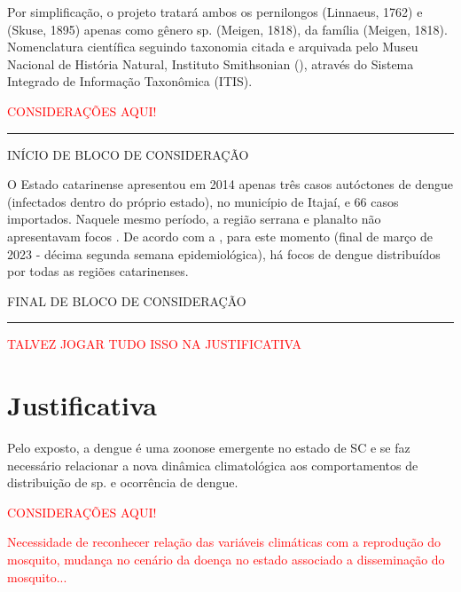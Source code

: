 \indent Por simplificação, o projeto tratará ambos os pernilongos  (Linnaeus, 1762) e  (Skuse, 1895) apenas como gênero  sp. (Meigen, 1818), da família  (Meigen, 1818). Nomenclatura científica seguindo taxonomia citada e arquivada pelo Museu Nacional de História Natural, Instituto Smithsonian (\citeyear{ITIS}), através do Sistema Integrado de Informação Taxonômica (\acrfull{ITIS}).


\newpage

\begin{center}
\textcolor{red}{CONSIDERAÇÕES AQUI!}
\end{center}

{\color{red} \rule{\linewidth}{0.5mm}}

\color{red} INÍCIO DE BLOCO DE CONSIDERAÇÃO

\indent O Estado catarinense apresentou em 2014 apenas três casos autóctones de dengue (infectados dentro do próprio estado), no município de Itajaí, e 66 casos importados. Naquele mesmo período, a região serrana e planalto não apresentavam focos \cite{Matiola2020Dissertação}. De acordo com a , para este momento (final de março de 2023 - décima segunda semana epidemiológica), há focos de dengue distribuídos por todas as regiões catarinenses.

FINAL DE BLOCO DE CONSIDERAÇÃO

{\color{red} \rule{\linewidth}{0.5mm}}

\color{black}


\textcolor{red}{TALVEZ JOGAR TUDO ISSO NA JUSTIFICATIVA}



\newpage
\section{Justificativa}
\indent Pelo exposto, a dengue é uma zoonose emergente no estado de \acrlong{SC} e se faz necessário relacionar a nova dinâmica climatológica aos comportamentos de distribuição de  sp. e ocorrência de dengue.

\begin{center}
\textcolor{red}{CONSIDERAÇÕES AQUI!}
\end{center}
\textcolor{red}{Necessidade de reconhecer relação das variáveis climáticas com a reprodução do mosquito, mudança no cenário da doença no estado associado a disseminação do mosquito...}

